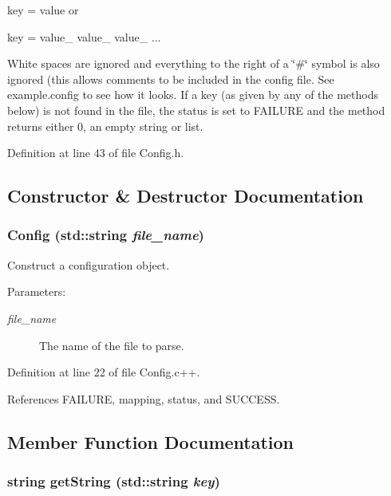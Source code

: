 key = value or

key = value\_ value\_ value\_ ...

White spaces are ignored and everything to the right of a \char`\"{}\#\char`\"{} symbol is also ignored (this allows comments to be included in the config file. See example.config to see how it looks. If a key (as given by any of the methods below) is not found in the file, the status is set to FAILURE and the method returns either 0, an empty string or list. 



Definition at line 43 of file Config.h.

\subsection{Constructor \& Destructor Documentation}
\subsubsection{\setlength{\rightskip}{0pt plus 5cm}\bf{Config} (std::string {\em file\_\-name})}\label{classConfig_fbfdcfcf947043c7a60488d4921ea060}


Construct a configuration object.

\begin{Desc}
\item[Parameters:]
\begin{description}
\item[{\em file\_\-name}]The name of the file to parse. \end{description}
\end{Desc}


Definition at line 22 of file Config.c++.

References FAILURE, mapping, status, and SUCCESS.

\subsection{Member Function Documentation}
\subsubsection{\setlength{\rightskip}{0pt plus 5cm}string get\-String (std::string {\em key})}\label{classConfig_f04a92c8ff1cb58b31673be54f7bfa6f}


